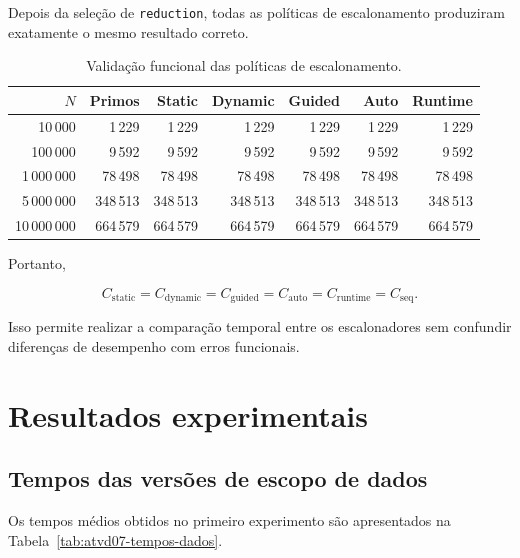 Depois da seleção de \texttt{reduction}, todas as políticas de
escalonamento produziram exatamente o mesmo resultado correto.

\begin{table}[htbp]
\centering
\caption{Validação funcional das políticas de escalonamento.}
\label{tab:atvd07-validacao-schedule}
\scriptsize
\begin{tabular}{|r|r|r|r|r|r|r|}
\hline
\textbf{\(N\)} &
\textbf{Primos} &
\textbf{Static} &
\textbf{Dynamic} &
\textbf{Guided} &
\textbf{Auto} &
\textbf{Runtime} \\
\hline
10\,000
& 1\,229 & 1\,229 & 1\,229 & 1\,229 & 1\,229 & 1\,229 \\
\hline
100\,000
& 9\,592 & 9\,592 & 9\,592 & 9\,592 & 9\,592 & 9\,592 \\
\hline
1\,000\,000
& 78\,498 & 78\,498 & 78\,498 & 78\,498 & 78\,498 & 78\,498 \\
\hline
5\,000\,000
& 348\,513 & 348\,513 & 348\,513 & 348\,513 & 348\,513 & 348\,513 \\
\hline
10\,000\,000
& 664\,579 & 664\,579 & 664\,579 & 664\,579 & 664\,579 & 664\,579 \\
\hline
\end{tabular}
\end{table}

Portanto,

\[
C_{\mathrm{static}}
=
C_{\mathrm{dynamic}}
=
C_{\mathrm{guided}}
=
C_{\mathrm{auto}}
=
C_{\mathrm{runtime}}
=
C_{\mathrm{seq}}.
\]

Isso permite realizar a comparação temporal entre os escalonadores sem
confundir diferenças de desempenho com erros funcionais.


\section{Resultados experimentais}
\label{sec:atvd07-resultados}

\subsection{Tempos das versões de escopo de dados}

Os tempos médios obtidos no primeiro experimento são apresentados na
Tabela~\ref{tab:atvd07-tempos-dados}.

